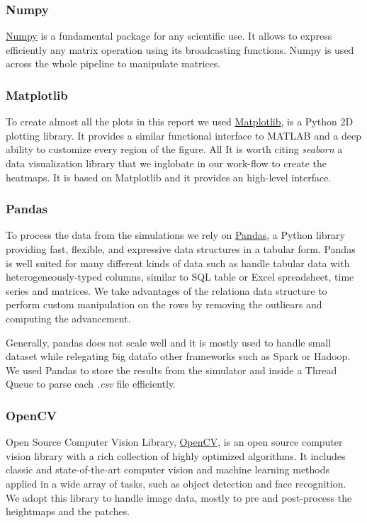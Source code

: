 \documentclass[../document.tex]{subfiles}
\begin{document}
\subsubsection{Numpy}
\href{https://www.numpy.org/}{Numpy} is a fundamental package for any scientific use. It allows to express efficiently any matrix operation using its broadcasting functions. Numpy is used across the whole pipeline to manipulate matrices.

\subsubsection{Matplotlib}
To create almost all the plots in this report we used \href{https://matplotlib.org/}{Matplotlib}, is a Python 2D plotting library. It provides a similar functional interface to MATLAB and a deep ability to customize every region of the figure. All 
It is worth citing \emph{seaborn} a data visualization library that we inglobate in our work-flow to create the heatmaps. It is based on Matplotlib and it provides an high-level interface.
\subsubsection{Pandas}
To process the data from the simulations we rely on \href{https://pandas.pydata.org/}{Pandas}, a Python library providing fast, flexible, and expressive data structures in a tabular form. Pandas is well suited for many different kinds of data such as handle tabular data with heterogeneously-typed columns, similar to SQL table or Excel spreadsheet, time series and matrices. We take advantages of the relationa data structure to perform custom manipulation on the rows by removing the outliears and computing the advancement.

Generally, pandas does not scale well and it is mostly used to handle small dataset while relegating \"big data\" to other frameworks such as Spark or Hadoop. We used Pandas to store the results from the simulator and inside a Thread Queue to parse each \emph{.csv} file efficiently. 

\subsubsection{OpenCV}
Open Source Computer Vision Library, \href{https://opencv.org/}{OpenCV}, is an open source computer vision library with a rich collection of highly optimized algorithms. It includes classic and state-of-the-art computer vision and machine learning methods applied in a wide array of tasks, such as object detection and face recognition. We adopt this library to handle image data, mostly to pre and post-process the heightmaps and the patches.
\end{document}
